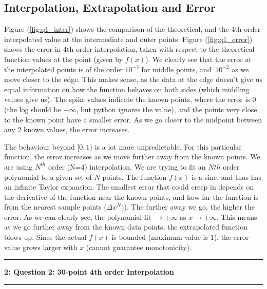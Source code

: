\documentclass[11pt]{article}
\newcommand\question[2]{\vspace{.25in}\hrule\textbf{#1: #2}\vspace{.5em}\hrule\vspace{.10in}}
\begin{document}
\subsection{Interpolation, Extrapolation and Error}
\label{exp1}

Figure (\ref{fig:q1_inter}) shows the comparison of the theoretical, and the 4th order interpolated value at the intermediate and outer points. Figure (\ref{fig:q1_error}) shows the error in 4th order interpolation, taken with respect to the theoretical function values at the point (given by $f(x)$). We clearly see that the error at the interpolated points is of the order $10^{-3}$ for middle points, and $~10^{-2}$ as we move closer to the edge. This makes sense, as the data at the edge doesn't give us equal information on how the function behaves on both sides (which middling values give us). The spike values indicate the known points, where the error is $0$ (the log should be $-\infty$, but python ignores the value), and the points very close to the known point have a smaller error. As we go closer to the midpoint between any 2 known values, the error increases. 

The behaviour beyond $[0,1)$ is a lot more unpredictable. For this particular function, the error increases as we move further away from the known points. We are using $N^{th}$ order (N=4) interpolation. We are trying to fit an $Nth$ order polynomial to a given set of $N$ points. The function $f(x)$ is a sine, and thus has an infinite Taylor expansion. The smallest error that could creep in depends on the derivative of the function near the known points, and how far the function is from the nearest sample points ($\Delta x^{N})$). The further away we go, the higher the error. 
As we can clearly see, the polynomial fit $\to\pm\infty$ as $x\to\pm\infty$. This means as we go further away from the known data points, the extrapolated function blows up. Since the actual $f(x)$ is bounded (maximum value is $1$), the error value grows larger with $x$ (cannot guarantee monotonicity). 

\pagebreak 
 
\question{2}{Question 2: 30-point 4th order Interpolation} 
\setcounter{section}{2}
\end{document}
